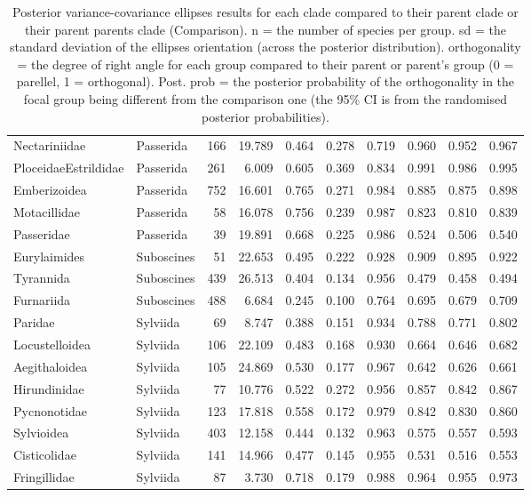 \begin{table}[ht]
\begin{tabular}{llrrrrrrrr}
  Nectariniidae & Passerida &  166 & 19.789 & 0.464 & 0.278 & 0.719 & 0.960 & 0.952 & 0.967 \\ 
  PloceidaeEstrildidae & Passerida &  261 & 6.009 & 0.605 & 0.369 & 0.834 & 0.991 & 0.986 & 0.995 \\ 
  Emberizoidea & Passerida &  752 & 16.601 & 0.765 & 0.271 & 0.984 & 0.885 & 0.875 & 0.898 \\ 
  Motacillidae & Passerida &   58 & 16.078 & 0.756 & 0.239 & 0.987 & 0.823 & 0.810 & 0.839 \\ 
  Passeridae & Passerida &   39 & 19.891 & 0.668 & 0.225 & 0.986 & 0.524 & 0.506 & 0.540 \\ 
  Eurylaimides & Suboscines &   51 & 22.653 & 0.495 & 0.222 & 0.928 & 0.909 & 0.895 & 0.922 \\ 
  Tyrannida & Suboscines &  439 & 26.513 & 0.404 & 0.134 & 0.956 & 0.479 & 0.458 & 0.494 \\ 
  Furnariida & Suboscines &  488 & 6.684 & 0.245 & 0.100 & 0.764 & 0.695 & 0.679 & 0.709 \\ 
  Paridae & Sylviida &   69 & 8.747 & 0.388 & 0.151 & 0.934 & 0.788 & 0.771 & 0.802 \\ 
  Locustelloidea & Sylviida &  106 & 22.109 & 0.483 & 0.168 & 0.930 & 0.664 & 0.646 & 0.682 \\ 
  Aegithaloidea & Sylviida &  105 & 24.869 & 0.530 & 0.177 & 0.967 & 0.642 & 0.626 & 0.661 \\ 
  Hirundinidae & Sylviida &   77 & 10.776 & 0.522 & 0.272 & 0.956 & 0.857 & 0.842 & 0.867 \\ 
  Pycnonotidae & Sylviida &  123 & 17.818 & 0.558 & 0.172 & 0.979 & 0.842 & 0.830 & 0.860 \\ 
  Sylvioidea & Sylviida &  403 & 12.158 & 0.444 & 0.132 & 0.963 & 0.575 & 0.557 & 0.593 \\ 
  Cisticolidae & Sylviida &  141 & 14.966 & 0.477 & 0.145 & 0.955 & 0.531 & 0.516 & 0.553 \\ 
  Fringillidae & Sylviida &   87 & 3.730 & 0.718 & 0.179 & 0.988 & 0.964 & 0.955 & 0.973 \\ 
   \hline
\end{tabular}
\caption{Posterior variance-covariance ellipses results for each clade compared to their parent clade or their parent parents clade (Comparison). n = the number of species per group. sd = the standard deviation of the ellipses orientation (across the posterior distribution). orthogonality = the degree of right angle for each group compared to their parent or parent's group (0 = parellel, 1 = orthogonal). Post. prob = the posterior probability of the orthogonality in the focal group being different from the comparison one (the 95\% CI is from the randomised posterior probabilities).} 
\label{tab_ortho_results}
\end{table}
